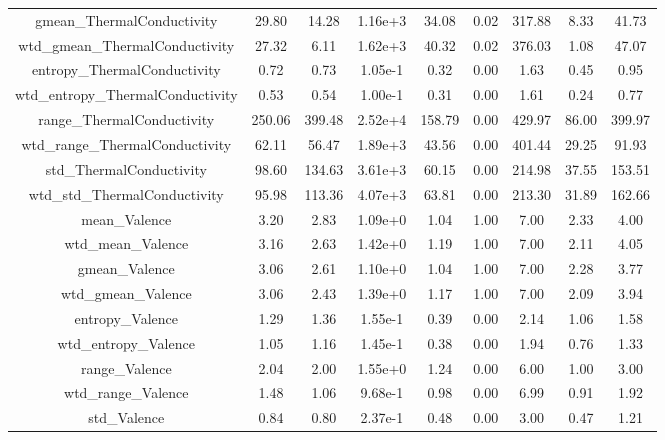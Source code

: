 \documentclass[11pt]{article}
\begin{document}
\begin{table}[H]
{\begin{tabular}{|c|c|c|c|c|c|c|c|c|}
gmean\_ThermalConductivity            &  29.80&    14.28&  1.16e+3&    34.08&    0.02&    317.88&     8.33&    41.73 \\
wtd\_gmean\_ThermalConductivity       &   27.32&     6.11&  1.62e+3&    40.32&    0.02&    376.03&     1.08&    47.07 \\
entropy\_ThermalConductivity          &   0.72&     0.73&  1.05e-1&     0.32&    0.00&      1.63&     0.45&     0.95 \\
wtd\_entropy\_ThermalConductivity     &    0.53&     0.54&  1.00e-1&     0.31&    0.00&      1.61&     0.24&     0.77 \\
range\_ThermalConductivity            & 250.06&   399.48&  2.52e+4&   158.79&    0.00&    429.97&    86.00&   399.97 \\
wtd\_range\_ThermalConductivity       &   62.11&    56.47&  1.89e+3&    43.56&    0.00&    401.44&    29.25&    91.93 \\
std\_ThermalConductivity              &  98.60&   134.63&  3.61e+3&    60.15&    0.00&    214.98&    37.55&   153.51 \\
wtd\_std\_ThermalConductivity         &   95.98&   113.36&  4.07e+3&    63.81&    0.00&    213.30&    31.89&   162.66 \\
mean\_Valence                         &   3.20&     2.83&  1.09e+0&     1.04&    1.00&      7.00&     2.33&     4.00 \\
wtd\_mean\_Valence                    &    3.16&     2.63&  1.42e+0&     1.19&    1.00&      7.00&     2.11&     4.05 \\
gmean\_Valence                        &   3.06&     2.61&  1.10e+0&     1.04&    1.00&      7.00&     2.28&     3.77 \\
wtd\_gmean\_Valence                   &    3.06&     2.43&  1.39e+0&     1.17&    1.00&      7.00&     2.09&     3.94 \\
entropy\_Valence                      &   1.29&     1.36&  1.55e-1&     0.39&    0.00&      2.14&     1.06&     1.58 \\
wtd\_entropy\_Valence                 &    1.05&     1.16&  1.45e-1&     0.38&    0.00&      1.94&     0.76&     1.33 \\
range\_Valence                        &   2.04&     2.00&  1.55e+0&     1.24&    0.00&      6.00&     1.00&     3.00 \\
wtd\_range\_Valence                   &    1.48&     1.06&  9.68e-1&     0.98&    0.00&      6.99&     0.91&     1.92 \\
std\_Valence                          &   0.84&     0.80&  2.37e-1&     0.48&    0.00&      3.00&     0.47&     1.21 \\

\end{tabular}}
\end{table}
\end{document}
